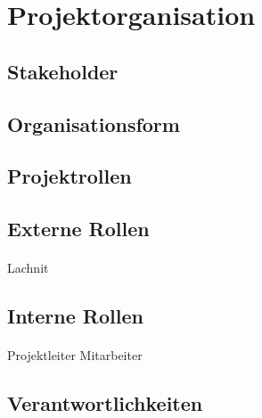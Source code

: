 \section{Projektorganisation}

\subsection{Stakeholder}
\subsection{Organisationsform}
\subsection{Projektrollen}
\subsection{Externe Rollen}

\paragraph*{}
Lachnit

\subsection{Interne Rollen}

\paragraph*{}
Projektleiter
Mitarbeiter

\subsection{Verantwortlichkeiten}